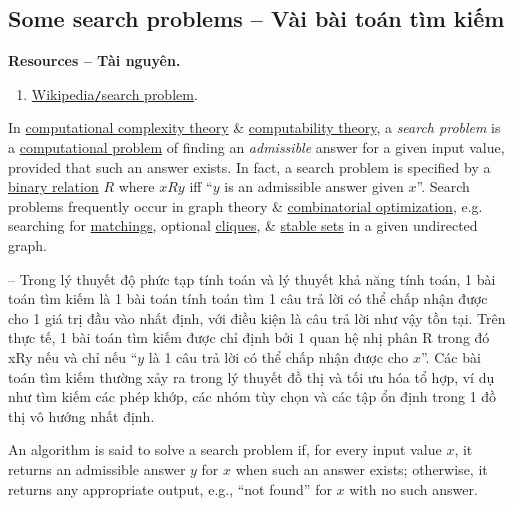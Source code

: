 \documentclass{article}
\begin{document}
\subsection{Some search problems -- Vài bài toán tìm kiếm}
\textbf{\textsf{Resources -- Tài nguyên.}}
\begin{enumerate}
	\item \href{https://en.wikipedia.org/wiki/Search_problem}{Wikipedia{\tt/}search problem}.
\end{enumerate}
In \href{https://en.wikipedia.org/wiki/Computational_complexity_theory}{computational complexity theory} \& \href{https://en.wikipedia.org/wiki/Computability_theory}{computability theory}, a {\it search problem} is a \href{https://en.wikipedia.org/wiki/Computational_problem}{computational problem} of finding an {\it admissible} answer for a given input value, provided that such an answer exists. In fact, a search problem is specified by a \href{https://en.wikipedia.org/wiki/Binary_relation}{binary relation} $R$ where $xRy$ iff ``$y$ is an admissible answer given $x$''. Search problems frequently occur in graph theory \& \href{https://en.wikipedia.org/wiki/Combinatorial_optimization}{combinatorial optimization}, e.g. searching for \href{https://en.wikipedia.org/wiki/Matching_(graph_theory)}{matchings}, optional \href{https://en.wikipedia.org/wiki/Clique_(graph_theory)}{cliques}, \& \href{https://en.wikipedia.org/wiki/Independent_set_(graph_theory)}{stable sets} in a given undirected graph.

-- Trong lý thuyết độ phức tạp tính toán và lý thuyết khả năng tính toán, 1 bài toán tìm kiếm là 1 bài toán tính toán tìm 1 câu trả lời có thể chấp nhận được cho 1 giá trị đầu vào nhất định, với điều kiện là câu trả lời như vậy tồn tại. Trên thực tế, 1 bài toán tìm kiếm được chỉ định bởi 1 quan hệ nhị phân R trong đó xRy nếu và chỉ nếu ``$y$ là 1 câu trả lời có thể chấp nhận được cho $x$''. Các bài toán tìm kiếm thường xảy ra trong lý thuyết đồ thị và tối ưu hóa tổ hợp, ví dụ như tìm kiếm các phép khớp, các nhóm tùy chọn và các tập ổn định trong 1 đồ thị vô hướng nhất định.

An algorithm is said to solve a search problem if, for every input value $x$, it returns an admissible answer $y$ for $x$ when such an answer exists; otherwise, it returns any appropriate output, e.g., ``not found'' for $x$ with no such answer.
\end{document}

